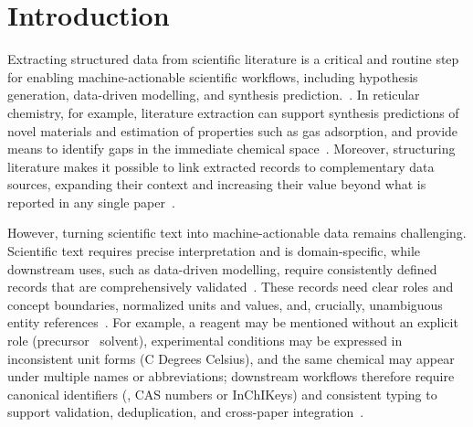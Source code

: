 \section{Introduction}\label{sec:introduction}


Extracting structured data from scientific literature is a critical and routine step for enabling machine-actionable scientific workflows, including hypothesis generation, data-driven modelling, and synthesis prediction.~\cite{grishman2015,krallinger2017,xu_large_2024}. In reticular chemistry, for example, literature extraction can support synthesis predictions of novel materials and estimation of properties such as gas adsorption, and provide means to identify gaps in the immediate chemical space~\cite{theworldavatar2025,kondinski2022,zheng2023,jablonka2024}. Moreover, structuring literature makes it possible to link extracted records to complementary data sources, expanding their context and increasing their value beyond what is reported in any single paper~\cite{martinezrodriguez2020,liang_survey_2024}.


However, turning scientific text into machine-actionable data remains challenging. Scientific text requires precise interpretation and is domain-specific, while downstream uses, such as data-driven modelling, require consistently defined records that are comprehensively validated~\cite{grishman2015,krallinger2017,xu_large_2024,schilling-wilhelmi_text_2025}. These records need clear roles and concept boundaries, normalized units and values, and, crucially, unambiguous entity references~\cite{wimalasuriya2010,martinezrodriguez2020,schilling-wilhelmi_text_2025}. For example, a reagent may be mentioned without an explicit role (precursor \vs \ solvent), experimental conditions may be expressed in inconsistent unit forms (\eg C \vs Degrees Celsius), and the same chemical may appear under multiple names or abbreviations; downstream workflows therefore require canonical identifiers (\eg, CAS numbers or InChIKeys) and consistent typing to support validation, deduplication, and cross-paper integration~\cite{pascazio2023,rihm2025}.


